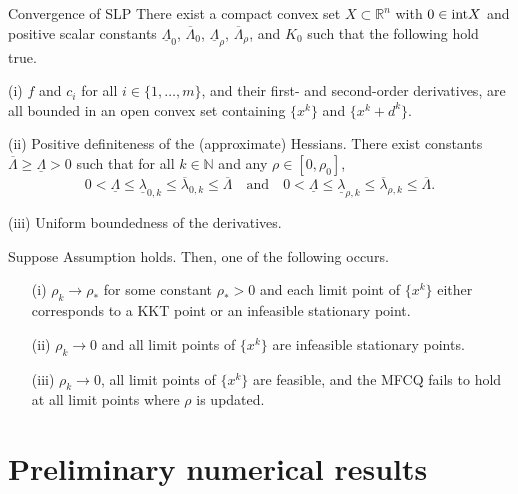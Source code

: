 \documentclass[8pt]{beamer}
\begin{document}
\begin{frame}{Convergence of SLP}
\bassumption
  There exist a compact convex set $X \subset \mathbb{R}^n$ with $0 \in {\rm{int}}{X}$ and positive scalar constants $\underline\Lambda_0$, $\overline\Lambda_0$, $\underline\Lambda_\rho$, $\overline\Lambda_\rho$, and $K_0$ such that the following hold true.
  \benumerate
    \item[(i)] $f$ and $c_i$ for all $i \in \{1,\dots,m\}$, and their first- and second-order derivatives, are all  bounded in an open convex set containing $\{x^k\}$ and $\{x^k+d^k\}$.
    \item[(ii)] Positive definiteness of the (approximate) Hessians. There exist constants $\overline\Lambda \ge \underline\Lambda > 0$ such that for all $k\in\mathbb{N}$ and  any $\rho\in[0, \rho_0]$,  
    \[ 0< \underline\Lambda \le \underline\lambda_{0,k} \leq \overline\lambda_{0,k} \leq \overline\Lambda\quad \text{and}\quad 0 < \underline\Lambda \leq \underline\lambda_{\rho,k} \leq \overline\lambda_{\rho,k} \le \overline\Lambda.\]
    \item[(iii)] Uniform boundedness of the derivatives. 
  \eenumerate
\eassumption

\vfill

\begin{theorem}  Suppose Assumption  holds. Then, one of the following occurs.
\begin{enumerate}
\item[(i)]  $\rho_k \to \rho_*$ for some constant $\rho_*>0$ and each limit point of $\{x^k\}$ either corresponds 
to a KKT point or an infeasible stationary point.
\item[(ii)] $\rho_k \to 0$ and all limit points of $\{x^k\}$ are infeasible stationary points.
\item[(iii)]  $\rho_k \to 0$, all limit points of $\{x^k\}$ are feasible, and the MFCQ fails to hold at all limit points 
where $\rho$ is updated. 
 
\end{enumerate}
 
\end{theorem}

\end{frame}






 






\section{Preliminary numerical results}
\end{document}
